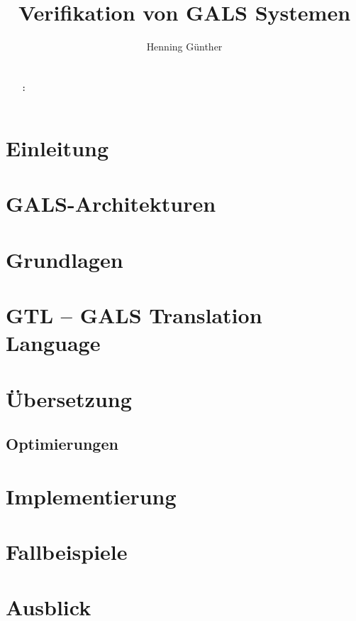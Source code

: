 \documentclass[masterarbeit]{thesis}
\title{Verifikation von GALS Systemen}
\author{Henning Günther}
\begin{document}
\maketitle

\pagestyle{headings}
\makeatletter
\erklaerung{\@author}
\makeatother

\begin{abstract}
  \thispagestyle{headings}
  
  \\[5pt]
  {\bf \keywordsname :} \makeatletter\@keywords\makeatother
\end{abstract}
\cleardoublepage
{}
\tableofcontents
\listoffigures
\listoftables
\cleardoublepage
{}
\chapter{Einleitung}

\chapter{GALS-Architekturen}
\label{sec:gals}

\chapter{Grundlagen}
\label{sec:basics}







\chapter{GTL -- GALS Translation Language}
\label{sec:gtl}

\chapter{Übersetzung}
\label{sec:translation}





\section{Optimierungen}



\chapter{Implementierung}
\label{sec:implementation}

\chapter{Fallbeispiele}
\label{sec:case_studies}

\chapter{Ausblick}
\label{sec:conclusion}


\begin{appendix}
  
  
\end{appendix}
\end{document}
